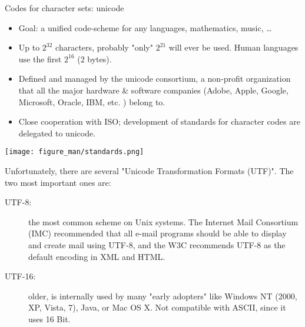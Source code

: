 \documentclass[11pt,compress,t,notes=noshow, xcolor=table]{beamer}
\begin{document}
\begin{vbframe}{Codes for character sets: unicode}
\begin{itemize}
\item Goal: a unified code-scheme for any
  languages, mathematics, music, \ldots
\item Up to $2^{32}$ characters, probably "only"
  $2^{21}$ will ever be used. Human languages use the
  first $2^{16}$ (2 bytes).
\item Defined and managed by the unicode consortium, a non-profit organization that
  all the major hardware \& software companies (Adobe, Apple, Google,
  Microsoft, Oracle, IBM, etc. ) belong to.\\


\item Close cooperation with ISO; development of standards for
  character codes are delegated to unicode.
\end{itemize}

\framebreak

  \begin{center}
    \texttt{[image: figure\_man/standards.png]}
  \end{center}

\framebreak

Unfortunately, there are several "Unicode Transformation Formats (UTF)".
The two most important ones are:
\begin{description}
\item[UTF-8:] the most common scheme on Unix systems. The Internet Mail Consortium (IMC) recommended that all e-mail programs should be able to display and create mail using UTF-8, and the W3C recommends UTF-8 as the default encoding in XML and HTML. 
\item[UTF-16:] older, is internally used by many "early adopters" like
  Windows NT (2000, XP, Vista, 7), Java, or Mac OS X. Not
  compatible with ASCII, since it uses 16 Bit.
\end{description}


\end{vbframe}
\end{document}
